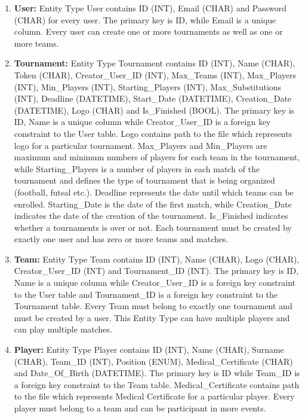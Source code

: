 \begin{enumerate}
    \item \textbf{User:} Entity Type User contains ID (INT), Email (CHAR) and Password (CHAR) for every user. The primary key is ID, while Email is a unique column. Every user can create one or more tournaments as well as one or more teams.

    \item \textbf{Tournament:} Entity Type Tournament contains ID (INT), Name (CHAR), Token (CHAR), Creator\_User\_ID (INT), Max\_Teams (INT), Max\_Players (INT), Min\_Players (INT), Starting\_Players (INT), Max\_Substitutions (INT), Deadline (DATETIME), Start\_Date (DATETIME), Creation\_Date (DATETIME), Logo (CHAR) and Is\_Finished (BOOL). The primary key is ID, Name is a unique column while Creator\_User\_ID is a foreign key constraint to the User table. Logo contains path to the file which represents logo for a particular tournament. Max\_Players and Min\_Players are maximum and minimum numbers of players for each team in the tournament, while Starting\_Players is a number of players in each match of the tournament and defines the type of tournament that is being organized (football, futsal etc.). Deadline represents the date until which teams can be enrolled. Starting\_Date is the date of the first match, while Creation\_Date indicates the date of the creation of the tournament. Is\_Finished indicates whether a tournaments is over or not. Each tournament must be created by exactly one user and has zero or more teams and matches.

    \item \textbf{Team:} Entity Type Team contains ID (INT), Name (CHAR), Logo (CHAR), Creator\_User\_ID (INT) and Tournament\_ID (INT). The primary key is ID, Name is a unique column while Creator\_User\_ID is a foreign key constraint to the User table and Tournament\_ID is a foreign key constraint to the Tournament table. Every Team must belong to exactly one tournament and must be created by a user. This Entity Type can have multiple players and can play multiple matches.

    \item \textbf{Player:} Entity Type Player contains ID (INT), Name (CHAR), Surname (CHAR), Team\_ID (INT), Position (ENUM), Medical\_Certificate (CHAR) and Date\_Of\_Birth (DATETIME). The primary key is ID while Team\_ID is a foreign key constraint to the Team table.  Medical\_Certificate contains path to the file which represents Medical Certificate for a particular player. Every player must belong to a team and can be participant in more events.


\end{enumerate}
